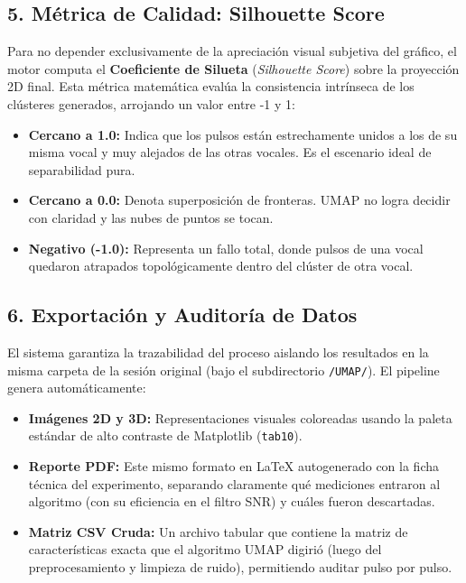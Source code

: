 \documentclass[12pt, a4paper]{article}
\begin{document}
\subsection{5. Métrica de Calidad: Silhouette Score}
Para no depender exclusivamente de la apreciación visual subjetiva del gráfico, el motor computa el \textbf{Coeficiente de Silueta} (\textit{Silhouette Score}) sobre la proyección 2D final. Esta métrica matemática evalúa la consistencia intrínseca de los clústeres generados, arrojando un valor entre -1 y 1:
\begin{itemize}
    \item \textbf{Cercano a 1.0:} Indica que los pulsos están estrechamente unidos a los de su misma vocal y muy alejados de las otras vocales. Es el escenario ideal de separabilidad pura.
    \item \textbf{Cercano a 0.0:} Denota superposición de fronteras. UMAP no logra decidir con claridad y las nubes de puntos se tocan.
    \item \textbf{Negativo (-1.0):} Representa un fallo total, donde pulsos de una vocal quedaron atrapados topológicamente dentro del clúster de otra vocal.
\end{itemize}

\subsection{6. Exportación y Auditoría de Datos}
El sistema garantiza la trazabilidad del proceso aislando los resultados en la misma carpeta de la sesión original (bajo el subdirectorio \texttt{/UMAP/}). El pipeline genera automáticamente:
\begin{itemize}
    \item \textbf{Imágenes 2D y 3D:} Representaciones visuales coloreadas usando la paleta estándar de alto contraste de Matplotlib (\texttt{tab10}).
    \item \textbf{Reporte PDF:} Este mismo formato en LaTeX autogenerado con la ficha técnica del experimento, separando claramente qué mediciones entraron al algoritmo (con su eficiencia en el filtro SNR) y cuáles fueron descartadas.
    \item \textbf{Matriz CSV Cruda:} Un archivo tabular que contiene la matriz de características exacta que el algoritmo UMAP digirió (luego del preprocesamiento y limpieza de ruido), permitiendo auditar pulso por pulso.
\end{itemize}
\end{document}
